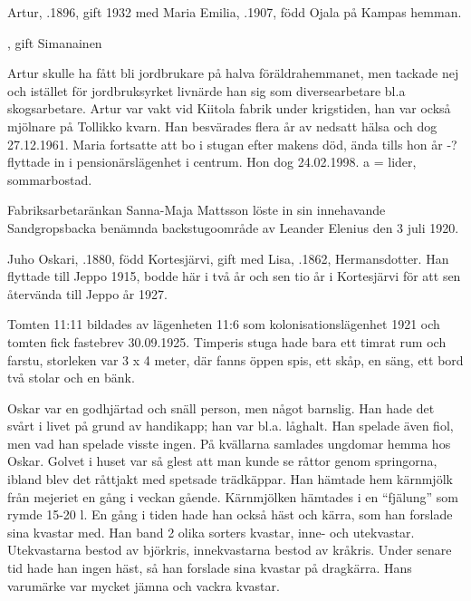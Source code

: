 Artur, .1896, gift 1932 med Maria Emilia, .1907, född Ojala på Kampas hemman.
\begin{jhchildren}
  \item {}
  \item {}, gift Simanainen
\end{jhchildren}
Artur skulle ha fått bli jordbrukare på halva föräldrahemmanet, men tackade nej och istället för jordbruksyrket livnärde han sig som diversearbetare bl.a skogsarbetare. Artur var vakt vid Kiitola fabrik under krigstiden, han var också mjölnare på Tollikko kvarn. Han besvärades flera år av nedsatt hälsa och dog 27.12.1961. Maria fortsatte att bo i stugan efter makens död, ända tills hon år -? flyttade in i pensionärslägenhet i centrum. Hon dog 24.02.1998. a = lider, 	sommarbostad.


Fabriksarbetaränkan Sanna-Maja Mattsson löste in sin innehavande Sandgropsbacka benämnda backstugoområde av Leander Elenius den 3 juli 1920.\jhvspace{}




Juho Oskari, .1880, född Kortesjärvi, gift med Lisa, .1862, Hermansdotter. Han flyttade till Jeppo 1915, bodde här i två år och sen tio år i Kortesjärvi för att sen återvända till Jeppo år 1927.

Tomten 11:11 bildades av lägenheten 11:6 som kolonisationslägenhet 1921 och tomten fick fastebrev 30.09.1925. Timperis stuga hade bara ett timrat rum och farstu, storleken var 3 x 4 meter, där fanns öppen spis, ett skåp, en säng, ett bord två stolar och en bänk.

Oskar var en godhjärtad och snäll person, men något barnslig. Han hade det svårt i livet på grund av handikapp; han var bl.a. låghalt. Han spelade även fiol, men vad han spelade visste ingen. På kvällarna samlades ungdomar hemma hos Oskar. Golvet i huset var så glest att man kunde se råttor genom springorna, ibland blev det råttjakt med spetsade trädkäppar. Han hämtade hem kärnmjölk från mejeriet en gång i veckan gående. Kärnmjölken hämtades i en ``fjälung'' som rymde 15-20 l. En gång i tiden hade han också häst och kärra, som han forslade sina kvastar med. Han band 2 olika sorters kvastar, inne- och utekvastar. Utekvastarna bestod av björkris, innekvastarna  bestod av kråkris. Under senare tid hade han ingen häst, så han forslade sina kvastar på dragkärra. Hans varumärke var mycket jämna och vackra kvastar.

